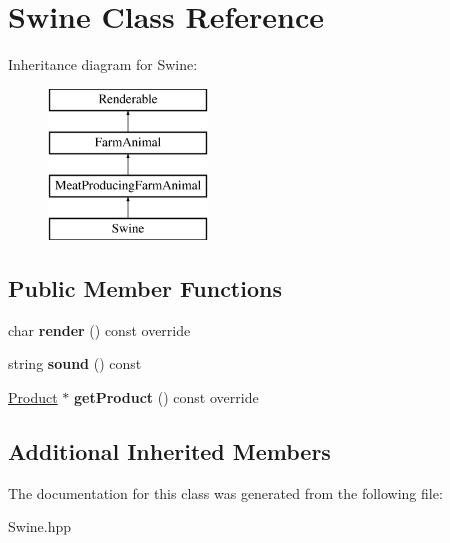 \hypertarget{class_swine}{}\section{Swine Class Reference}
\label{class_swine}
Inheritance diagram for Swine\+:\begin{figure}[H]
\begin{center}
\leavevmode
\includegraphics[height=4.000000cm]{class_swine}
\end{center}
\end{figure}
\subsection*{Public Member Functions}
\begin{DoxyCompactItemize}
\item 
\mbox{\label{class_swine_a2c75aa06dedaafc6217f9b6bab00fe71}} 
char {\bfseries render} () const override
\item 
\mbox{\label{class_swine_a600028e1ccf7e256d4154a981da0b09b}} 
string {\bfseries sound} () const
\item 
\mbox{\label{class_swine_ad654e7ad9b11b277e2ada28c88f3688f}} 
\mbox{\hyperlink{class_product}{Product}} $\ast$ {\bfseries get\+Product} () const override
\end{DoxyCompactItemize}
\subsection*{Additional Inherited Members}


The documentation for this class was generated from the following file\+:\begin{DoxyCompactItemize}
\item 
Swine.\+hpp\end{DoxyCompactItemize}
